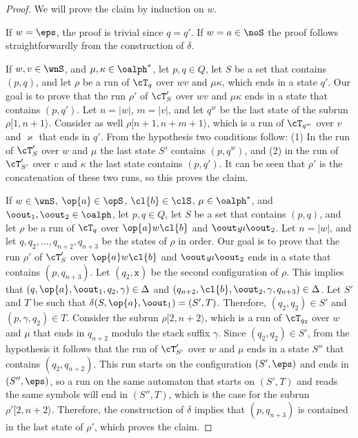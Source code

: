 \begin{proof}
	We will prove the claim by induction on $w$.
	
	If $w = \eps$, the proof is trivial since $q = q'$. If $w = a\in\noS$ the proof follows straightforwardly from the construction of $\delta$.
	
	If $w,v\in\wnS$, and $\mu, \kappa \in \oalph^*$, let $p,q\in Q$, let $S$ be a set that contains $(p,q)$, and let $\rho$ be a run of $\cT_q$ over $wv$ and $\mu\kappa$, which ends in a state $q'$. 
	Our goal is to prove that the run $\rho'$ of $\cT'_S$ over $wv$ and $\mu\kappa$ ends in a state that contains $(p,q')$. 
	Let $n = \vert w\vert$, $m = \vert v \vert$, and let $q^w$ be the last state of the subrun $\rho[1,n+1\rangle$. 
	Consider as well $\rho[n+1,n+m+1\rangle$, which is a run of $\cT_{q^w}$ over $v$ and $\varkappa$ that ends in $q'$. 
	From the hypothesis two conditions follow: 
	(1) In the run of $\cT'_S$ over $w$ and $\mu$ the last state $S'$ contains $(p,q^w)$, and 
	(2) in the run of $\cT'_{S'}$ over $v$ and $\kappa$ the last state contains $(p,q')$. 
	It can be seen that $\rho'$ is the concatenation of these two runs, so this proves the claim.
	
	If $w\in\wnS$, $\op{a}\in\opS$, $\cl{b}\in\clS$, $\mu\in\oalph^*$, and $\oout_1,\oout_2\in\oalph$, let $p,q\in Q$, let $S$ be a set that contains $(p,q)$, and let $\rho$ be a run of $\cT_q$ over $\op{a}w\cl{b}$ and $\oout_1\!\mu\oout_2$. 
	Let $n = \vert w\vert$, and let $q, q_2, \ldots, q_{n+2}, q_{n+3}$ be the states of $\rho$ in order. 
	Our goal is to prove that the run $\rho'$ of $\cT'_S$ over $\op{a}w\cl{b}$ and $\oout_1\!\mu\oout_2$ ends in a state that contains $(p,q_{n+3})$. 
	Let $(q_2,\mathtt{x})$ be the second configuration of $\rho$. 
	This implies that $(q,\op{a},\oout_1,q_2,\gamma)\in\Delta$ and $(q_{n+2},\cl{b},\oout_2,\gamma,q_{n+3})\in\Delta$.
	Let $S'$ and $T$ be such that $\delta(S,\op{a},\oout_1) = (S',T)$.
	Therefore, $(q_2,q_2)\in S'$ and $(p,\gamma,q_2)\in T$.
	Consider the subrun $\rho[2,n+2\rangle$, which is a run of $\cT_{q_2}$ over $w$ and $\mu$ that ends in $q_{n+2}$ modulo the stack suffix $\gamma$.
	Since $(q_2,q_2)\in S'$, from the hypothesis it follows that the run of $\cT'_{S'}$ over $w$ and $\mu$ ends in a state $S''$ that contains $(q_2,q_{n+2})$.
	This run starts on the configuration $(S',\eps)$ and ends in $(S'',\eps)$, so a run on the same automaton that starts on $(S',T)$ and reads the same symbols will end in $(S'', T)$, which is the case for the subrun $\rho'[2,n+2\rangle$.
	Therefore, the construction of $\delta$ implies that $(p,q_{n+3})$ is contained in the last state of $\rho'$, which proves the claim.
\end{proof}

